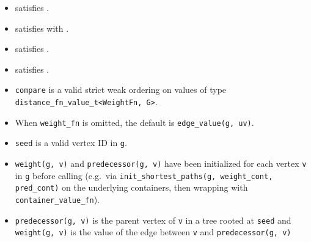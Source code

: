 \begin{itemdescr}
      \pnum\mandates
            \begin{itemize}
                  \item {} satisfies .
                  \item {} satisfies 
                        with .
                  \item {} satisfies .
                  \item {} satisfies
                        .
                  \item \lstinline{compare} is a valid strict weak ordering on values of type \lstinline{distance_fn_value_t<WeightFn, G>}.
            \end{itemize}
      \pnum\preconditions
            \begin{itemize}
                  \item
                        When \lstinline{weight_fn} is omitted, the default is \lstinline{edge_value(g, uv)}.
            \end{itemize}
      \pnum\hardprecond
            \begin{itemize}
                  \item
                        \lstinline{seed} is a valid vertex ID in \lstinline{g}.
                  \item
                        \lstinline{weight(g, v)} and \lstinline{predecessor(g, v)} have been initialized for
                        each vertex \lstinline{v} in \lstinline{g} before calling
                        (e.g.~via \lstinline{init_shortest_paths(g, weight_cont, pred_cont)} on the
                        underlying containers, then wrapping with \lstinline{container_value_fn}).
            \end{itemize}
      \pnum\effects
            \begin{itemize}
                  \item
                        \lstinline{predecessor(g, v)} is the parent vertex of \lstinline{v} in a tree rooted at \lstinline{seed}
                        and \lstinline{weight(g, v)} is the value of the edge between \lstinline{v} and \lstinline{predecessor(g, v)}

\end{itemize}
\end{itemdescr}
